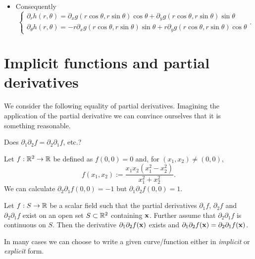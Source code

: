\begin{example}
\begin{itemize}
        \item Consequently
              \[
                  \begin{cases}
                      \partial_r h(r,\theta) = \partial_x g(r\cos \theta, r\sin \theta) \cos \theta + \partial_y g(r\cos \theta, r\sin \theta)\sin \theta \\
                      \partial_\theta h(r,\theta) = - r \partial_x g(r\cos \theta, r\sin \theta) \sin \theta +  r \partial_y g(r\cos \theta, r\sin \theta)\cos \theta
                  \end{cases}.
              \]
    \end{itemize}
\end{example}






\section{Implicit functions and partial derivatives}


We consider the following equality of partial derivatives.
Imagining the application of the partial derivative we can convince ourselves that it is something reasonable.

Does \(\partial_1\partial_2 f = \partial_2\partial_1 f\), etc.?

\begin{example*}
    Let \(f:\mathbb{R}^2 \to \mathbb{R}\) be defined as \(f(0,0)=0\) and, for \((x_1,x_2)\neq (0,0)\),
    \[
        f(x_1,x_2) := \frac{x_1x_2(x_1^2 - x_2^2)}{x_1^2 + x_2^2}.
    \]
    We can calculate \(\partial_2\partial_1 f (0,0) = -1\) but
    \(\partial_1\partial_2 f(0,0) = 1\).
\end{example*}

\begin{theorem}
    Let \(f:S\to\mathbb{R}\) be a scalar field such that the partial derivatives \(\partial_1 f\), \(\partial_2 f\) and \(\partial_2\partial_1 f\) exist on an open set \(S\subset \mathbb{R}^2\) containing \(\mathbf{x}\).
    Further assume that \(\partial_2\partial_1 f\) is continuous on \(S\).
    Then the derivative \(\partial_1\partial_2 f(\mathbf{x})\) exists and \(\partial_1\partial_2 f(\mathbf{x})=\partial_2\partial_1 f(\mathbf{x})\).
\end{theorem}

In many cases we can choose to write a given curve/function either in \emph{implicit} or \emph{explicit} form.

